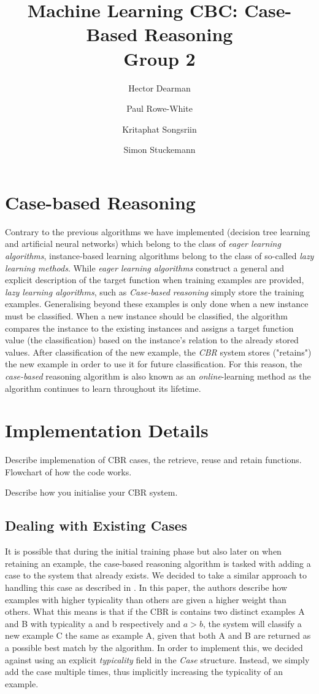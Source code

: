 \documentclass[10pt,a4paper]{article}
\author{Hector Dearman \and Paul Rowe-White \and Kritaphat Songsriin \and Simon Stuckemann}
\title{Machine Learning CBC: Case-Based Reasoning\\Group 2}
\begin{document}
\maketitle

\section{Case-based Reasoning}
Contrary to the previous algorithms we have implemented (decision tree learning and artificial neural networks) which belong to the class of \emph{eager learning algorithms}, instance-based learning algorithms belong to the class  of so-called \emph{lazy learning methods}. 
While \emph{eager learning algorithms} construct a general and explicit description of the target function when training examples are provided, \emph{lazy learning algorithms}, such as \emph{Case-based reasoning} simply store the training examples. Generalising beyond these examples is only done when a new instance must be classified. When a new instance should be classified, the algorithm compares the instance to the existing instances and assigns a target function value (the classification) based on the instance's relation to the already stored values. After classification of the new example, the \emph{CBR} system stores ("retains") the new example in order to use it for future classification. For this reason, the \emph{case-based} reasoning algorithm is also known as an \emph{online}-learning method as the algorithm continues to learn throughout its lifetime.

\section{Implementation Details}
Describe implemenation of CBR cases, the retrieve, reuse and retain functions. Flowchart of how the code works.

Describe how you initialise your CBR system.

\subsection{Dealing with Existing Cases}

It is possible that during the initial training phase but also later on when retaining an example, the case-based reasoning algorithm is tasked with adding a case to the system that already exists. We decided to take a similar approach to handling this case as described in \cite{Pantic2004}. In this paper, the authors describe how examples with higher typicality than others are given a higher weight than others. What this means is that if the CBR is contains two distinct examples A and B with typicality a and b respectively and $a > b$, the system will classify a new example C the same as example A, given that both A and B are returned as a possible best match by the algorithm. 
In order to implement this, we decided against using an explicit \emph{typicality} field in the \emph{Case} structure. Instead, we simply add the case multiple times, thus implicitly increasing the typicality of an example. 
\end{document}
